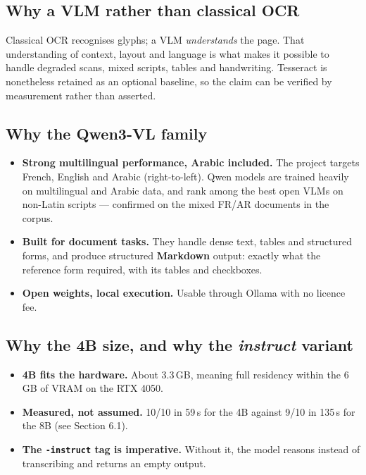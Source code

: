 \documentclass[11pt,a4paper]{article}
\begin{document}
\subsection{Why a VLM rather than classical OCR}

Classical OCR recognises glyphs; a VLM \emph{understands} the page. That
understanding of context, layout and language is what makes it possible to
handle degraded scans, mixed scripts, tables and handwriting. Tesseract is
nonetheless retained as an optional baseline, so the claim can be verified by
measurement rather than asserted.

\subsection{Why the Qwen3-VL family}
\begin{itemize}
  \item \textbf{Strong multilingual performance, Arabic included.} The project
        targets French, English and Arabic (right-to-left). Qwen models are
        trained heavily on multilingual and Arabic data, and rank among the best
        open VLMs on non-Latin scripts --- confirmed on the mixed FR/AR
        documents in the corpus.
  \item \textbf{Built for document tasks.} They handle dense text, tables and
        structured forms, and produce structured \textbf{Markdown} output:
        exactly what the reference form required, with its tables and
        checkboxes.
  \item \textbf{Open weights, local execution.} Usable through Ollama with no
        licence fee.
\end{itemize}

\subsection{Why the 4B size, and why the \emph{instruct} variant}
\begin{itemize}
  \item \textbf{4B fits the hardware.} About 3.3\,GB, meaning full residency
        within the 6\,GB of VRAM on the RTX 4050.
  \item \textbf{Measured, not assumed.} 10/10 in 59\,s for the 4B against 9/10
        in 135\,s for the 8B (see Section 6.1).
  \item \textbf{The \texttt{-instruct} tag is imperative.} Without it, the model
        reasons instead of transcribing and returns an empty output.
\end{itemize}
\end{document}
